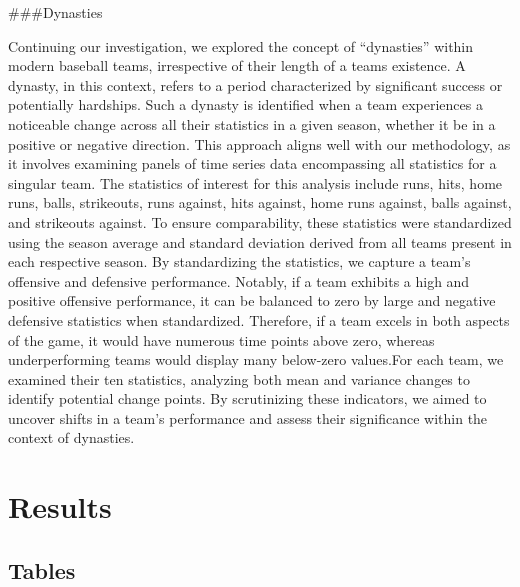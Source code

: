 \documentclass[
  12pt,
]{article}
\begin{document}
\#\#\#Dynasties

Continuing our investigation, we explored the concept of ``dynasties''
within modern baseball teams, irrespective of their length of a teams
existence. A dynasty, in this context, refers to a period characterized
by significant success or potentially hardships. Such a dynasty is
identified when a team experiences a noticeable change across all their
statistics in a given season, whether it be in a positive or negative
direction. This approach aligns well with our methodology, as it
involves examining panels of time series data encompassing all
statistics for a singular team. The statistics of interest for this
analysis include runs, hits, home runs, balls, strikeouts, runs against,
hits against, home runs against, balls against, and strikeouts against.
To ensure comparability, these statistics were standardized using the
season average and standard deviation derived from all teams present in
each respective season. By standardizing the statistics, we capture a
team's offensive and defensive performance. Notably, if a team exhibits
a high and positive offensive performance, it can be balanced to zero by
large and negative defensive statistics when standardized. Therefore, if
a team excels in both aspects of the game, it would have numerous time
points above zero, whereas underperforming teams would display many
below-zero values.For each team, we examined their ten statistics,
analyzing both mean and variance changes to identify potential change
points. By scrutinizing these indicators, we aimed to uncover shifts in
a team's performance and assess their significance within the context of
dynasties.

\hypertarget{results}{%
\section{Results}\label{results}}

\hypertarget{tables}{%
\subsection{Tables}\label{tables}}
\end{document}
